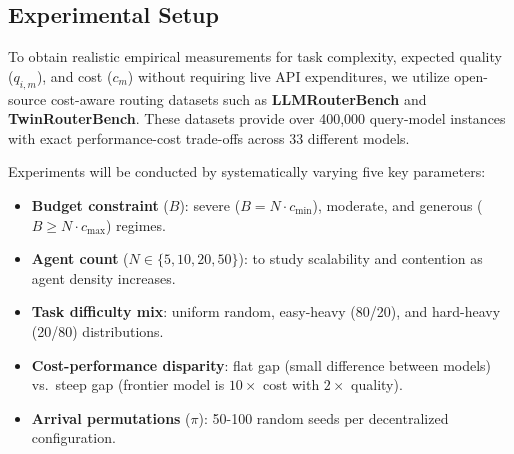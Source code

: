 \documentclass{article}
\begin{document}




\subsection{Experimental Setup} 
\label{sec:setup}

To obtain realistic empirical measurements for task complexity, expected quality ($q_{i,m}$), and cost ($c_m$) without requiring live API expenditures, we utilize open-source cost-aware routing datasets such as \textbf{LLMRouterBench} and \textbf{TwinRouterBench}. These datasets provide over 400,000 query-model instances with exact performance-cost trade-offs across 33 different models. 

Experiments will be conducted by systematically varying five key parameters: 

\begin{itemize}[leftmargin=*] 
    \item \textbf{Budget constraint} ($B$): severe ($B = N \cdot c_{\min}$), moderate, and generous ($B \geq N \cdot c_{\max}$) regimes.
    \item \textbf{Agent count} ($N \in \{5, 10, 20, 50\}$): to study scalability and contention as agent density increases.
    \item \textbf{Task difficulty mix}: uniform random, easy-heavy (80/20), and hard-heavy (20/80) distributions.
    \item \textbf{Cost-performance disparity}: flat gap (small difference between models) vs.\ steep gap (frontier model is $10\times$ cost with $2\times$ quality).
    \item \textbf{Arrival permutations} ($\pi$): 50-100 random seeds per decentralized configuration.
\end{itemize} 
\end{document}
